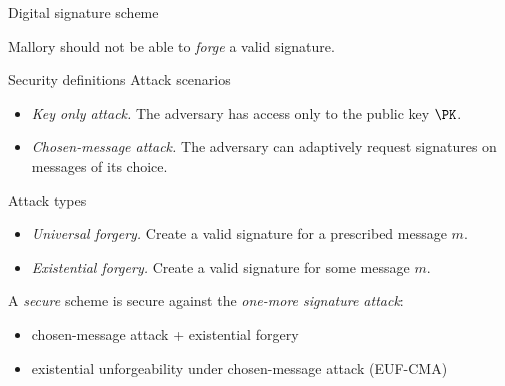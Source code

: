 \begin{frame}{Digital signature scheme}
  \pause
  \begin{center}
  \end{center}

  \pause
  Mallory should not be able to \emph{forge} a valid signature.
\end{frame}

\begin{frame}{Security definitions}
  Attack scenarios
  \begin{itemize}[<+(1)->]
    \item \emph{Key only attack.}
    The adversary has access only to the public key $\PK$.
    \item \emph{Chosen-message attack.}
    The adversary can adaptively request signatures on messages of its choice.
  \end{itemize}

  \pause
  Attack types
  \begin{itemize}[<+(1)->]
    \item \emph{Universal forgery.}
    Create a valid signature for a prescribed message $m$.
    \item \emph{Existential forgery.}
    Create a valid signature for some message $m$.
  \end{itemize}

  \pause
  A \emph{secure} scheme is secure against the \emph{one-more signature attack}:
  \begin{itemize}[<+(1)->]
    \item chosen-message attack + existential forgery
    \item existential unforgeability under chosen-message attack (EUF-CMA)
  \end{itemize}
\end{frame}

